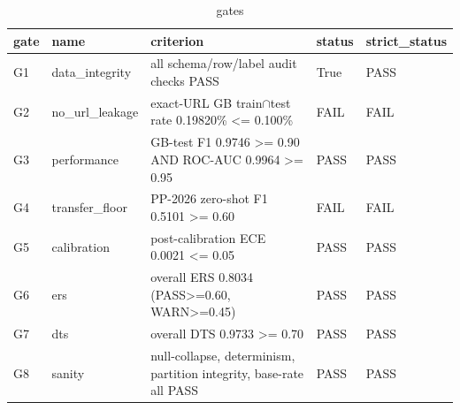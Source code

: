 \begin{table}[htbp]
\caption{gates}
\label{tab:gates}
\begin{tabular}{lllll}
\toprule
gate & name & criterion & status & strict_status \\
\midrule
G1 & data\_integrity & all schema/row/label audit checks PASS & True & PASS \\
G2 & no\_url\_leakage & exact-URL GB train$\cap$test rate 0.19820\% <= 0.100\% & FAIL & FAIL \\
G3 & performance & GB-test F1 0.9746 >= 0.90 AND ROC-AUC 0.9964 >= 0.95 & PASS & PASS \\
G4 & transfer\_floor & PP-2026 zero-shot F1 0.5101 >= 0.60 & FAIL & FAIL \\
G5 & calibration & post-calibration ECE 0.0021 <= 0.05 & PASS & PASS \\
G6 & ers & overall ERS 0.8034 (PASS>=0.60, WARN>=0.45) & PASS & PASS \\
G7 & dts & overall DTS 0.9733 >= 0.70 & PASS & PASS \\
G8 & sanity & null-collapse, determinism, partition integrity, base-rate all PASS & PASS & PASS \\
\bottomrule
\end{tabular}
\end{table}
